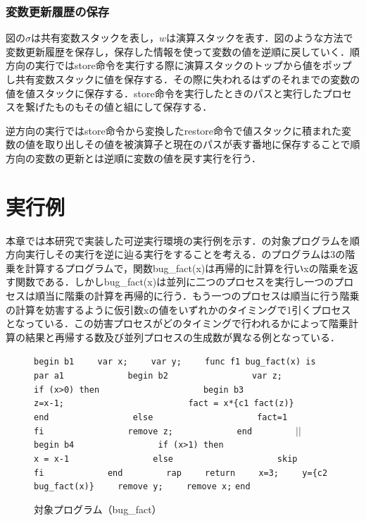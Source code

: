 \documentclass[submit,PRO]{ipsj}
\def\|{\verb|}
\begin{document}
%4.2.2
\subsubsection{変数更新履歴の保存}

図の$\sigma$は共有変数スタックを表し，$w$は演算スタックを表す．図のような方法で変数更新履歴を保存し，保存した情報を使って変数の値を逆順に戻していく．順方向の実行ではstore命令を実行する際に演算スタックのトップから値をポップし共有変数スタックに値を保存する．その際に失われるはずのそれまでの変数の値を値スタックに保存する．store命令を実行したときのパスと実行したプロセスを繋げたものもその値と組にして保存する．

逆方向の実行ではstore命令から変換したrestore命令で値スタックに積まれた変数の値を取り出しその値を被演算子と現在のパスが表す番地に保存することで順方向の変数の更新とは逆順に変数の値を戻す実行を行う．


%5
\section{実行例}

本章では本研究で実装した可逆実行環境の実行例を示す．の対象プログラムを順方向実行しその実行を逆に辿る実行をすることを考える．のプログラムは3の階乗を計算するプログラムで，関数bug\_fact(x)は再帰的に計算を行いxの階乗を返す関数である．しかしbug\_fact(x)は並列に二つのプロセスを実行し一つのプロセスは順当に階乗の計算を再帰的に行う．もう一つのプロセスは順当に行う階乗の計算を妨害するように仮引数xの値をいずれかのタイミングで1引くプロセスとなっている．この妨害プロセスがどのタイミングで行われるかによって階乗計算の結果と再帰する数及び並列プロセスの生成数が異なる例となっている．



\begin{figure}[tb]
\vbox{
\hbox{\|begin b1|}
\hbox{\|    var x;|}
\hbox{\|    var y;|}
\hbox{\|    func f1 bug_fact(x) is|}
\hbox{\|        par a1|}
\hbox{\|            begin b2|}
\hbox{\|                var z;|}
\hbox{\|                if (x>0) then|}
\hbox{\|                    begin b3|}
\hbox{\|                        z=x-1;|}
\hbox{\|                        fact = x*{c1 fact(z)}|}
\hbox{\|                    end|}
\hbox{\|                else|}
\hbox{\|                    fact=1|}
\hbox{\|                fi|}
\hbox{\|                remove z;|}
\hbox{\|            end|}
\hbox{\|        |$||$\|  begin b4|}
\hbox{\|                if (x>1) then|}
\hbox{\|                    x = x-1|}
\hbox{\|                else|}
\hbox{\|                    skip|}
\hbox{\|                fi|}
\hbox{\|            end|}
\hbox{\|        rap|}
\hbox{\|    return|}
\hbox{\|    x=3;|}
\hbox{\|    y={c2 bug_fact(x)}|}
\hbox{\|    remove y;|}
\hbox{\|    remove x;|}
\hbox{\|end|}
}
\centerline{}
\caption{対象プログラム（bug\_fact）}
\label{fig:target}
\end{figure}
\end{document}

